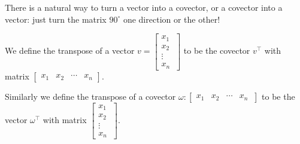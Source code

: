 \documentclass{ximera}
\begin{document}
There is a natural way to turn a vector into a covector, or a covector into a vector:  just turn the matrix $90^\circ$ one direction or the other!

\begin{definition}
  We define the transpose of a vector $v = \begin{bmatrix} x_1 \\x_2\\ \vdots \\ x_n\ \end{bmatrix}$ to be the covector $v^\top$ with matrix 
  $\begin{bmatrix} x_1 &x_2& \cdots &x_n \end{bmatrix}$.
	
  Similarly we define the transpose of a covector $\omega: \begin{bmatrix} x_1 &x_2& \cdots &x_n\ \end{bmatrix}$ to be the vector $\omega^\top$ with matrix
  $\begin{bmatrix} x_1 \\x_2\\ \vdots \\ x_n\ \end{bmatrix}$.  
\end{definition}
\end{document}
